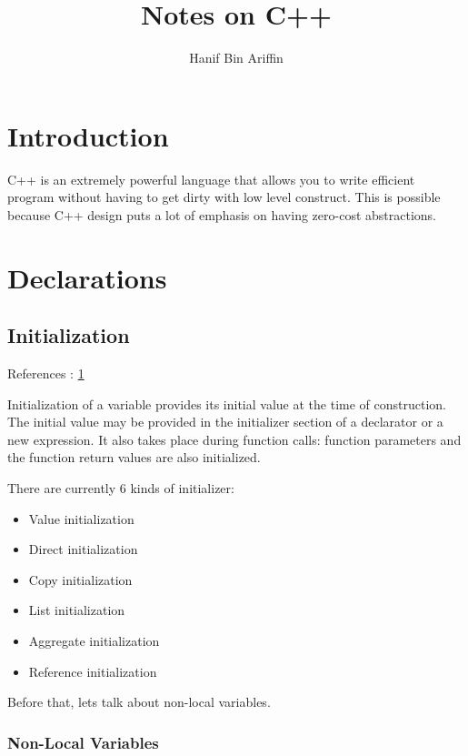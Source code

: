 \documentclass[a4paper, 12pt]{extbook}
\title{Notes on C++}
\author{Hanif Bin Ariffin}
\begin{document}
\maketitle
\tableofcontents

\newpage
\section{Introduction}

C++ is an extremely powerful language that allows you to write efficient program without having to get dirty with low level construct.
This is possible because C++ design puts a lot of emphasis on having zero-cost abstractions.

\section{Declarations}

\subsection{Initialization}

References : \href{https://en.cppreference.com/w/cpp/language/initialization}{1}

Initialization of a variable provides its initial value at the time of construction.
The initial value may be provided in the initializer section of a declarator or a new expression.
It also takes place during function calls: function parameters and the function return values are also initialized.

There are currently 6 kinds of initializer:

\begin{itemize}
  \item Value initialization
  \item Direct initialization
  \item Copy initialization
  \item List initialization
  \item Aggregate initialization
  \item Reference initialization
\end{itemize}

Before that, lets talk about non-local variables.

\subsubsection{Non-Local Variables}
\end{document}

